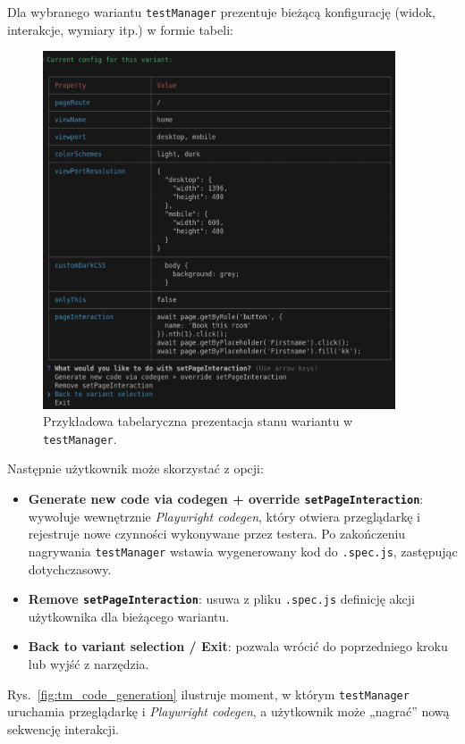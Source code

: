 \documentclass[12pt]{report}
\begin{document}
Dla wybranego wariantu \texttt{testManager} prezentuje bieżącą konfigurację (widok, interakcje, wymiary itp.) w formie tabeli:

\begin{figure}[H]
\centering
\includegraphics[width=0.93\textwidth]{tm_variant_details_menu.png}
\caption{Przykładowa tabelaryczna prezentacja stanu wariantu w \texttt{testManager}.}
\label{fig:tm_variant_details_menu}
\end{figure}

Następnie użytkownik może skorzystać z opcji:
\begin{itemize}
   \item \textbf{Generate new code via codegen + override \texttt{setPageInteraction}}:  
   wywołuje wewnętrznie \emph{Playwright codegen}, który otwiera przeglądarkę i rejestruje nowe czynności wykonywane przez testera. Po zakończeniu nagrywania \texttt{testManager} wstawia wygenerowany kod do \texttt{.spec.js}, zastępując dotychczasowy.
   \item \textbf{Remove \texttt{setPageInteraction}}:  
   usuwa z pliku \texttt{.spec.js} definicję akcji użytkownika dla bieżącego wariantu.
   \item \textbf{Back to variant selection / Exit}:  
   pozwala wrócić do poprzedniego kroku lub wyjść z narzędzia.
\end{itemize}

Rys.~\ref{fig:tm_code_generation} ilustruje moment, w którym \texttt{testManager} uruchamia przeglądarkę i \emph{Playwright codegen}, a użytkownik może „nagrać” nową sekwencję interakcji.
\end{document}

